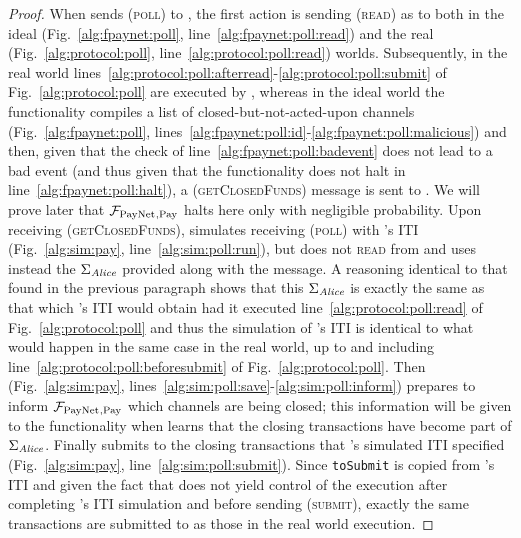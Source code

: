 \begin{proof}
  When \environment{} sends (\textsc{poll}) to \alice, the first action is
  sending (\textsc{read}) as \alice{} to \ledger{} both in the ideal
  (Fig.~\ref{alg:fpaynet:poll}, line~\ref{alg:fpaynet:poll:read}) and the real
  (Fig.~\ref{alg:protocol:poll}, line~\ref{alg:protocol:poll:read}) worlds.
  Subsequently, in the real world
  lines~\ref{alg:protocol:poll:afterread}-\ref{alg:protocol:poll:submit} of
  Fig.~\ref{alg:protocol:poll} are executed by \alice, whereas in the ideal
  world the functionality compiles a list of closed-but-not-acted-upon channels
  (Fig.~\ref{alg:fpaynet:poll},
  lines~\ref{alg:fpaynet:poll:id}-\ref{alg:fpaynet:poll:malicious}) and then,
  given that the check of line~\ref{alg:fpaynet:poll:badevent} does not lead to
  a bad event (and thus given that the functionality does not halt in
  line~\ref{alg:fpaynet:poll:halt}), a (\textsc{getClosedFunds}) message is sent
  to \simulator. We will prove later that $\mathcal{F}_{\mathrm{PayNet}}{}_{\mathrm{, Pay}}$ halts
  here only with negligible probability. Upon receiving
  (\textsc{getClosedFunds}), \simulator{} simulates receiving (\textsc{poll})
  with \alice's ITI (Fig.~\ref{alg:sim:pay}, line~\ref{alg:sim:poll:run}), but
  does not \textsc{read} from \ledger{} and uses instead the $\Sigma_{\mathit{Alice}}$
  provided along with the message. A reasoning identical to that found in the
  previous paragraph shows that this $\Sigma_{\mathit{Alice}}$ is exactly the same as
  that which \alice's ITI would obtain had it executed
  line~\ref{alg:protocol:poll:read} of Fig.~\ref{alg:protocol:poll} and thus the
  simulation of \alice's ITI is identical to what would happen in the same case
  in the real world, up to and including
  line~\ref{alg:protocol:poll:beforesubmit} of Fig.~\ref{alg:protocol:poll}.
  Then (Fig.~\ref{alg:sim:pay},
  lines~\ref{alg:sim:poll:save}-\ref{alg:sim:poll:inform}) \simulator{} prepares
  to inform $\mathcal{F}_{\mathrm{PayNet}}{}_{\mathrm{, Pay}}$ which channels are being closed; this
  information will be given to the functionality when \simulator{} learns that
  the closing transactions have become part of $\Sigma_{\mathit{Alice}}$. Finally
  \simulator{} submits to \ledger{} the closing transactions that \alice's
  simulated ITI specified (Fig.~\ref{alg:sim:pay},
  line~\ref{alg:sim:poll:submit}). Since \texttt{toSubmit} is copied from
  \alice's ITI and given the fact that \simulator{} does not yield control of
  the execution after completing \alice's ITI simulation and before sending
  (\textsc{submit}), exactly the same transactions are submitted to \ledger{} as
  those in the real world execution.


\end{proof}
